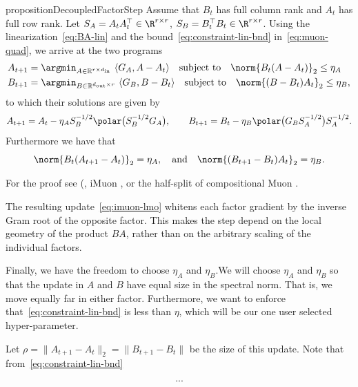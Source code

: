\begin{restatable}{proposition}{DecoupledFactorStep}\label{prop:decoupled}
Assume that \(B_t\) has full column rank and \(A_t\) has full row rank. 
Let $S_A=A_tA_t^\top \in \R^{r \times r}$, $S_B=B_t^\top B_t \in \R^{r \times r}$.
Using the linearization~\eqref{eq:BA-lin} and the bound~\eqref{eq:constraint-lin-bnd}
in~\eqref{eq:muon-quad},
we arrive at the two programs
\begin{align}
  A_{t+1}& =   \argmin_{ 
A \in \mathbb{R}^{r \times d_{\mathrm{in}}}}~ \langle G_A, A-A_t\rangle \quad \textnormal{subject to}\quad  \norm{B_t(A-A_t)}_2\le\eta_A \nonumber \\
 B_{t+1} &=   \argmin_{B \in \mathbb{R}^{d_{\mathrm{out}} \times r}}~ \langle G_B,  B -B_t\rangle \quad \textnormal{subject to}\quad  \norm{(B-B_t) A_t}_2\le\eta_B,
  \label{eq:imuon-lmo}
\end{align}
to which their solutions are  given by 
\begin{equation*}
 A_{t+1}= A_t-\eta_A S_B^{-1/2} \polar \big(S_B^{-1/2}G_A\big),
 \qquad
B_{t+1}= B_t-\eta_B \polar \big(G_B S_A^{-1/2}\big) S_A^{-1/2}.
\end{equation*}
Furthermore we have that 
\begin{equation} \label{cor:imuon}
    \norm{B_t(A_{t+1}-A_t)}_2 = \eta_A, \quad \mbox{and} \quad   \norm{(B_{t+1}-B_t) A_t}_2 = \eta_B.
\end{equation}
\end{restatable}

For the proof see 
(, iMuon \cite{imuon}, or the half-split of compositional Muon \cite{tilde_csd}.


The resulting update~\eqref{eq:imuon-lmo} whitens each factor gradient by the inverse Gram root of the opposite factor. This makes the step depend on the local geometry of the product \(BA\), rather than on the arbitrary scaling of the individual factors.

Finally, we have the freedom to choose $\eta_A$ and $\eta_B$.We will choose $\eta_A$ and $\eta_B$ so that the update in $A$ and $B$ have equal size in the spectral norm. That is, we move equally far in either factor. Furthermore, we want to enforce that~\eqref{eq:constraint-lin-bnd} is less than $\eta$, which will be our one user selected hyper-parameter. 

Let $\rho = \|A_{t+1}-A_t\|_2 = \|B_{t+1}-B_t\|$ be the size of this update. Note that from~\eqref{eq:constraint-lin-bnd} 

\[ ... \]


